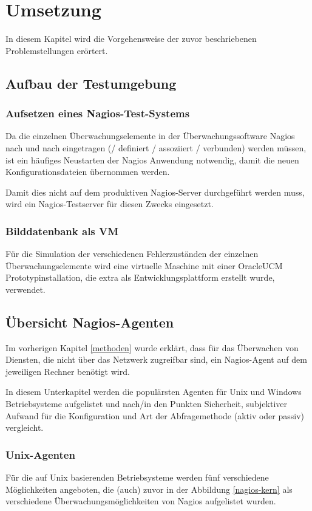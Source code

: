 \section{Umsetzung}
In diesem Kapitel wird die Vorgehensweise der zuvor beschriebenen Problemstellungen erörtert.

\subsection{Aufbau der Testumgebung}




\subsubsection{Aufsetzen eines Nagios-Test-Systems}
Da die einzelnen Überwachungselemente in der Überwachungssoftware Nagios nach und nach eingetragen (/ definiert / assoziiert / verbunden) werden müssen, ist ein häufiges Neustarten der Nagios Anwendung notwendig, damit die neuen Konfigurationsdateien übernommen werden.

Damit dies nicht auf dem produktiven Nagios-Server durchgeführt werden muss, wird ein Nagios-Testserver für diesen Zwecks eingesetzt.

\subsubsection{Bilddatenbank als VM}
Für die Simulation der verschiedenen Fehlerzuständen der einzelnen Überwachungselemente wird eine virtuelle Maschine mit einer \gls{OracleUCM} Prototypinstallation, die extra als Entwicklungsplattform erstellt wurde, verwendet.


\subsection{Übersicht Nagios-Agenten}
Im vorherigen Kapitel \ref{methoden} wurde erklärt, dass für das Überwachen von Diensten, die nicht über das Netzwerk zugreifbar sind, ein Nagios-Agent auf dem jeweiligen Rechner benötigt wird.

In diesem Unterkapitel werden die populärsten Agenten für Unix und Windows Betriebsysteme aufgelistet und nach/in den Punkten Sicherheit, subjektiver Aufwand für die Konfiguration und Art der Abfragemethode (aktiv oder passiv) vergleicht.
\newpage
\subsubsection{Unix-Agenten}
Für die auf Unix basierenden Betriebsysteme werden fünf verschiedene Möglichkeiten angeboten, die (auch) zuvor in der Abbildung \ref{nagios-kern} als verschiedene Überwachungsmöglichkeiten von Nagios aufgelistet wurden.

